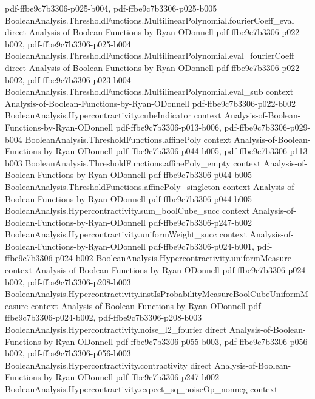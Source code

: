 \begin{theorem}
{    pdf-ffbe9c7b3306-p025-b004,
    pdf-ffbe9c7b3306-p025-b005}
\proofstep
  {BooleanAnalysis.ThresholdFunctions.MultilinearPolynomial.fourierCoeff_eval}
  {direct}
  {Analysis-of-Boolean-Functions-by-Ryan-ODonnell}
  {pdf-ffbe9c7b3306-p022-b002,
    pdf-ffbe9c7b3306-p025-b004}
\proofstep
  {BooleanAnalysis.ThresholdFunctions.MultilinearPolynomial.eval_fourierCoeff}
  {direct}
  {Analysis-of-Boolean-Functions-by-Ryan-ODonnell}
  {pdf-ffbe9c7b3306-p022-b002,
    pdf-ffbe9c7b3306-p023-b004}
\proofstep
  {BooleanAnalysis.ThresholdFunctions.MultilinearPolynomial.eval_sub}
  {context}
  {Analysis-of-Boolean-Functions-by-Ryan-ODonnell}
  {pdf-ffbe9c7b3306-p022-b002}
\proofstep
  {BooleanAnalysis.Hypercontractivity.cubeIndicator}
  {context}
  {Analysis-of-Boolean-Functions-by-Ryan-ODonnell}
  {pdf-ffbe9c7b3306-p013-b006,
    pdf-ffbe9c7b3306-p029-b004}
\proofstep
  {BooleanAnalysis.ThresholdFunctions.affinePoly}
  {context}
  {Analysis-of-Boolean-Functions-by-Ryan-ODonnell}
  {pdf-ffbe9c7b3306-p044-b005,
    pdf-ffbe9c7b3306-p113-b003}
\proofstep
  {BooleanAnalysis.ThresholdFunctions.affinePoly_empty}
  {context}
  {Analysis-of-Boolean-Functions-by-Ryan-ODonnell}
  {pdf-ffbe9c7b3306-p044-b005}
\proofstep
  {BooleanAnalysis.ThresholdFunctions.affinePoly_singleton}
  {context}
  {Analysis-of-Boolean-Functions-by-Ryan-ODonnell}
  {pdf-ffbe9c7b3306-p044-b005}
\proofstep
  {BooleanAnalysis.Hypercontractivity.sum_boolCube_succ}
  {context}
  {Analysis-of-Boolean-Functions-by-Ryan-ODonnell}
  {pdf-ffbe9c7b3306-p247-b002}
\proofstep
  {BooleanAnalysis.Hypercontractivity.uniformWeight_succ}
  {context}
  {Analysis-of-Boolean-Functions-by-Ryan-ODonnell}
  {pdf-ffbe9c7b3306-p024-b001,
    pdf-ffbe9c7b3306-p024-b002}
\proofstep
  {BooleanAnalysis.Hypercontractivity.uniformMeasure}
  {context}
  {Analysis-of-Boolean-Functions-by-Ryan-ODonnell}
  {pdf-ffbe9c7b3306-p024-b002,
    pdf-ffbe9c7b3306-p208-b003}
\proofstep
  {BooleanAnalysis.Hypercontractivity.instIsProbabilityMeasureBoolCubeUniformMeasure}
  {context}
  {Analysis-of-Boolean-Functions-by-Ryan-ODonnell}
  {pdf-ffbe9c7b3306-p024-b002,
    pdf-ffbe9c7b3306-p208-b003}
\proofstep
  {BooleanAnalysis.Hypercontractivity.noise_l2_fourier}
  {direct}
  {Analysis-of-Boolean-Functions-by-Ryan-ODonnell}
  {pdf-ffbe9c7b3306-p055-b003,
    pdf-ffbe9c7b3306-p056-b002,
    pdf-ffbe9c7b3306-p056-b003}
\proofstep
  {BooleanAnalysis.Hypercontractivity.contractivity}
  {direct}
  {Analysis-of-Boolean-Functions-by-Ryan-ODonnell}
  {pdf-ffbe9c7b3306-p247-b002}
\proofstep
  {BooleanAnalysis.Hypercontractivity.expect_sq_noiseOp_nonneg}
  {context}

\end{theorem}
